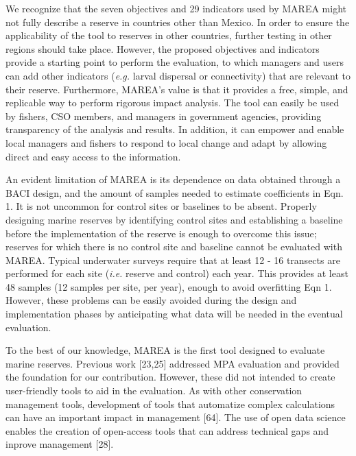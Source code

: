 \documentclass[12pt,]{article}
\begin{document}
We recognize that the seven objectives and 29 indicators used by MAREA
might not fully describe a reserve in countries other than Mexico. In
order to ensure the applicability of the tool to reserves in other
countries, further testing in other regions should take place. However,
the proposed objectives and indicators provide a starting point to
perform the evaluation, to which managers and users can add other
indicators (\emph{e.g.} larval dispersal or connectivity) that are
relevant to their reserve. Furthermore, MAREA's value is that it
provides a free, simple, and replicable way to perform rigorous impact
analysis. The tool can easily be used by fishers, CSO members, and
managers in government agencies, providing transparency of the analysis
and results. In addition, it can empower and enable local managers and
fishers to respond to local change and adapt by allowing direct and easy
access to the information.

An evident limitation of MAREA is its dependence on data obtained
through a BACI design, and the amount of samples needed to estimate
coefficients in Eqn. 1. It is not uncommon for control sites or
baselines to be absent. Properly designing marine reserves by
identifying control sites and establishing a baseline before the
implementation of the reserve is enough to overcome this issue; reserves
for which there is no control site and baseline cannot be evaluated with
MAREA. Typical underwater surveys require that at least 12 - 16
transects are performed for each site (\emph{i.e.} reserve and control)
each year. This provides at least 48 samples (12 samples per site, per
year), enough to avoid overfitting Eqn 1. However, these problems can be
easily avoided during the design and implementation phases by
anticipating what data will be needed in the eventual evaluation.

To the best of our knowledge, MAREA is the first tool designed to
evaluate marine reserves. Previous work {[}23,25{]} addressed MPA
evaluation and provided the foundation for our contribution. However,
these did not intended to create user-friendly tools to aid in the
evaluation. As with other conservation management tools, development of
tools that automatize complex calculations can have an important impact
in management {[}64{]}. The use of open data science enables the
creation of open-access tools that can address technical gaps and
inprove management {[}28{]}.
\end{document}
